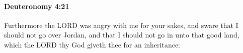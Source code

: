 
		\paragraph{Deuteronomy 4:21} %
			\label{DEUTERONOMY-4-21}

			Furthermore the LORD was angry with me for your sakes, and sware that I should not go over Jordan, and that I should not go in unto that good land, which the LORD thy God giveth thee for an inheritance:


